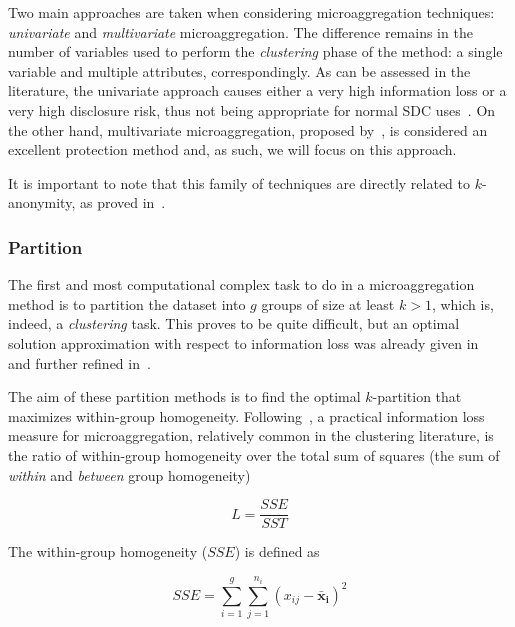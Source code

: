 Two main approaches are taken when considering microaggregation techniques: \textit{univariate} and \textit{multivariate} microaggregation. The difference remains in the number of variables used to perform the \textit{clustering} phase of the method: a single variable and multiple attributes, correspondingly. As can be assessed in the literature, the univariate approach causes either a very high information loss or a very high disclosure risk, thus not being appropriate for normal SDC uses~\citep[p. 63]{Hundepool:StatisticalDisclosureControl}. On the other hand, multivariate microaggregation, proposed by~\citet{Domingo:PracticalMicroaggregation}, is considered an excellent protection method and, as such, we will focus on this approach.

It is important to note that this family of techniques are directly related to $k$-anonymity, as proved in~\citet{Domingo:KAnonMicroagg}.

\subsubsection{Partition}

The first and most computational complex task to do in a microaggregation method is to partition the dataset into $g$ groups of size at least $k > 1$, which is, indeed, a \textit{clustering} task. This proves to be quite difficult, but an optimal solution approximation with respect to information loss was already given in~\citep{Domingo:KAnonMicroagg} and further refined in~\citet{Domingo:MuAproxPolyTimeMicroagg}.

The aim of these partition methods is to find the optimal $k$-partition that maximizes within-group homogeneity. Following~\citet{Domingo:PracticalMicroaggregation}, a practical information loss measure for microaggregation, relatively common in the clustering literature, is the ratio of within-group homogeneity over the total sum of squares (the sum of \textit{within} and \textit{between} group homogeneity)

\begin{equation}\label{eq:clustering-info-loss}
L = \frac{SSE}{SST}
\end{equation}

The within-group homogeneity ($SSE$) is defined as

\begin{equation}
SSE = \sum_{i=1}^{g} \sum_{j=1}^{n_i} (x_{ij} - \mathbf{\bar{x}_i})^2
\end{equation}

